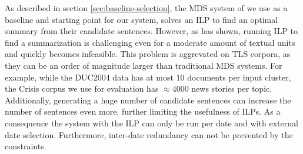 \documentclass[a4paper,BCOR=10mm]{report}
\numberwithin{lemma}{chapter}
\numberwithin{definition}{chapter}
\begin{document}
%
%
%
%
%
%
%
%
%
%

As described in section \ref{sec:baseline-selection}, the MDS system of \citet{banerjee} we use as a baseline and starting point for our system, solves an ILP to find an optimal summary from their candidate sentences.
However, as \citet{mcdonald} has shown, running ILP to find a summarization is challenging even for a moderate amount of textual units and quickly becomes infeasible.
This problem is aggrevated on TLS corpora, as they can be an order of magnitude larger than traditional MDS systems. For example, while the DUC2004 data has at most 10 documents per input cluster, the Crisis corpus we use for evaluation has $\approx 4000$ news stories per topic. Additionally, generating a huge number of candidate sentences can increase the number of sentences even more, further limiting the usefulness of ILPs. As a consequence the system with the ILP can only be run per date and with external date selection. Furthermore, inter-date redundancy can not be prevented by the constraints.
\end{document}
